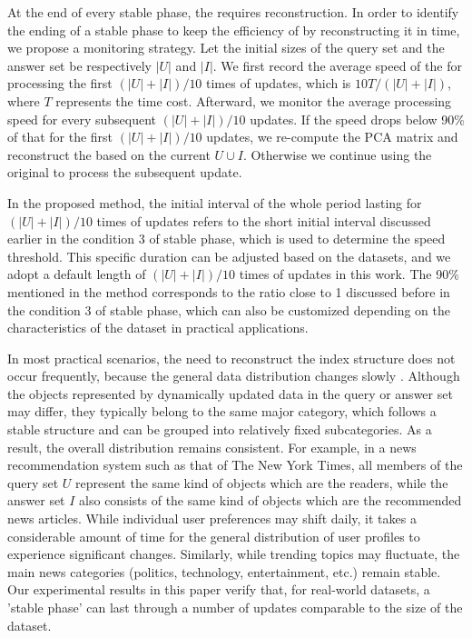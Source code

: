 At the end of every stable phase, the \dualtree requires reconstruction. In order to identify the ending of a stable phase to keep the efficiency of \dualtree by reconstructing it in time, we propose a monitoring strategy. Let the initial sizes of the query set and the answer set be respectively $|U|$ and $|I|$. We first record the average speed of the \dualtree for processing the first $(|U|+|I|)/10$ times of updates, which is $10T/(|U|+|I|)$, where $T$ represents the time cost. Afterward, we monitor the average processing speed for every subsequent $(|U|+|I|)/10$ updates. If the speed drops below 90\% of that for the first $(|U|+|I|)/10$ updates, we re-compute the PCA matrix and reconstruct the \dualtree based on the current $U\cup I$. Otherwise we continue using the original \dualtree to process the subsequent update. 

In the proposed method, the initial interval of the whole period lasting for $(|U|+|I|)/10$ times of updates refers to the short initial interval discussed earlier in the condition 3 of stable phase, which is used to determine the speed threshold. This specific duration can be adjusted based on the datasets, and we adopt a default length of $(|U|+|I|)/10$ times of updates in this work. The 90\% mentioned in the method corresponds to the ratio close to 1 discussed before in the condition 3 of stable phase, which can also be customized depending on the characteristics of the dataset in practical applications.

In most practical scenarios, the need to reconstruct the index structure does not occur frequently, because the general data distribution changes slowly \cite{aggarwal2016recommender, gama2014survey}. Although the objects represented by dynamically updated data in the query or answer set may differ, they typically belong to the same major category, which follows a stable structure and can be grouped into relatively fixed subcategories. As a result, the overall distribution remains consistent. For example, in a news recommendation system such as that of The New York Times, all members of the query set 
$U$ represent the same kind of objects which are the readers, while the answer set
$I$ also consists of the same kind of objects which are the recommended news articles. While individual user preferences may shift daily, it takes a considerable amount of time for the general distribution of user profiles to experience significant changes. Similarly, while trending topics may fluctuate, the main news categories (politics, technology, entertainment, etc.) remain stable. Our experimental results in this paper verify that, for real-world datasets, a 'stable phase' can last through a number of updates comparable to the size of the dataset. 

